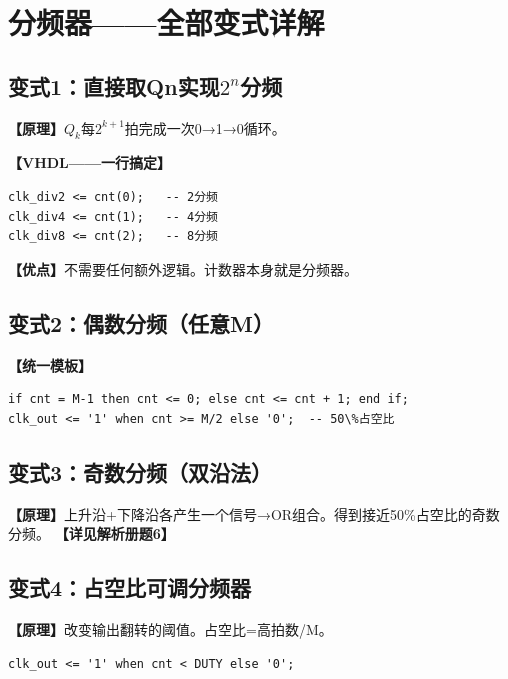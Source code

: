 \chapter{分频器——全部变式详解}

\section{变式1：直接取Qn实现$2^n$分频}

\begin{detailbox}[完整教学]
\textbf{【原理】}$Q_k$每$2^{k+1}$拍完成一次0→1→0循环。

\textbf{【VHDL——一行搞定】}
\begin{lstlisting}
clk_div2 <= cnt(0);   -- 2分频
clk_div4 <= cnt(1);   -- 4分频
clk_div8 <= cnt(2);   -- 8分频
\end{lstlisting}

\textbf{【优点】}不需要任何额外逻辑。计数器本身就是分频器。
\end{detailbox}


\section{变式2：偶数分频（任意M）}

\begin{detailbox}[完整教学]
\textbf{【统一模板】}
\begin{lstlisting}
if cnt = M-1 then cnt <= 0; else cnt <= cnt + 1; end if;
clk_out <= '1' when cnt >= M/2 else '0';  -- 50\%占空比
\end{lstlisting}
\end{detailbox}


\section{变式3：奇数分频（双沿法）}

\begin{detailbox}[完整教学]
\textbf{【原理】}上升沿+下降沿各产生一个信号→OR组合。得到接近50\%占空比的奇数分频。
\textbf{【详见解析册题6】}
\end{detailbox}


\section{变式4：占空比可调分频器}

\begin{detailbox}[完整教学]
\textbf{【原理】}改变输出翻转的阈值。占空比=高拍数/M。
\begin{lstlisting}
clk_out <= '1' when cnt < DUTY else '0';
\end{lstlisting}
\end{detailbox}


